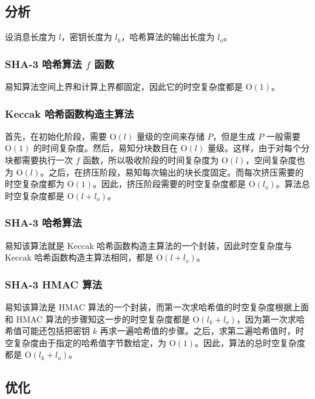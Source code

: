 \documentclass[12pt,a4paper]{article}
\begin{document}
\subsection*{分析}

设消息长度为 $ l $，密钥长度为 $ l_k $，哈希算法的输出长度为 $ l_o $。

\subsubsection*{SHA-3 哈希算法 $ f $ 函数}

易知算法空间上界和计算上界都固定，因此它的时空复杂度都是 $ \mathrm{O}(1) $。

\subsubsection*{Keccak 哈希函数构造主算法}

首先，在初始化阶段，需要 $ \mathrm{O}(l) $ 量级的空间来存储 $ P $，但是生成 $ P $ 一般需要 $ \mathrm{O}(1) $ 的时间复杂度。然后，易知分块数目在 $ \mathrm{O}(l) $ 量级。这样，由于对每个分块都需要执行一次 $ f $ 函数，所以吸收阶段的时间复杂度为 $ \mathrm{O}(l) $，空间复杂度也为 $ \mathrm{O}(l) $。之后，在挤压阶段，易知每次输出的块长度固定。而每次挤压需要的时空复杂度都为 $ \mathrm{O}(1) $。因此，挤压阶段需要的时空复杂度都是 $ \mathrm{O}(l_o) $。算法总时空复杂度都是 $ \mathrm{O}(l + l_o) $。

\subsubsection*{SHA-3 哈希算法}

易知该算法就是 Keccak 哈希函数构造主算法的一个封装，因此时空复杂度与 Keccak 哈希函数构造主算法相同，都是 $ \mathrm{O}(l + l_o) $。

\subsubsection*{SHA-3 HMAC 算法}

易知该算法是 HMAC 算法的一个封装，而第一次求哈希值的时空复杂度根据上面和 HMAC 算法的步骤知这一步的时空复杂度都是 $ \mathrm{O}(l_k + l_o) $，因为第一次求哈希值可能还包括把密钥 $ k $ 再求一遍哈希值的步骤。之后，求第二遍哈希值时，时空复杂度由于指定的哈希值字节数给定，为 $ \mathrm{O}(1) $。因此，算法的总时空复杂度都是 $ \mathrm{O}(l_k + l_o) $。

\subsection*{优化}
\end{document}
